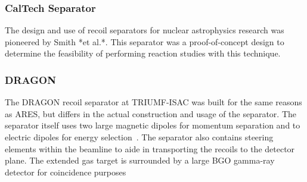 \subsubsection{CalTech Separator}

The design and use of recoil separators for nuclear astrophysics research was
pioneered by Smith *et al.*. This separator was a proof-of-concept design to
determine the feasibility of performing reaction studies with this technique.

\subsubsection{DRAGON}
The DRAGON recoil separator at TRIUMF-ISAC was built for the same reasons as ARES,
but differs in the actual construction and usage of the separator.
The separator
itself uses two large magnetic dipoles for momentum separation and to electric
dipoles for energy selection~\cite{Engel2005}. The separator also contains
steering elements within the beamline to aide in transporting the recoils to
the detector plane. The extended gas target is surrounded by a large BGO
gamma-ray detector for coincidence purposes


